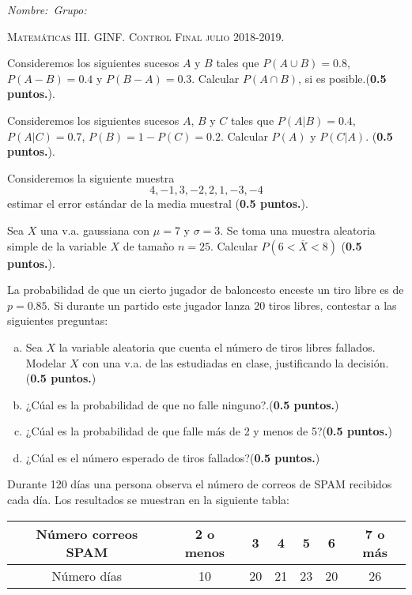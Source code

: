 \documentclass[12pt]{article}\usepackage[]{graphicx}\usepackage[]{color}
\newcounter{problemes}
\newcounter{punts} \def\thepunts{\arabic{punts}}
\def\probl{\addtocounter{problemes}{1} \setcounter{punts}{0}
\medskip\noindent{\bf \theproblemes) }}
\begin{document}
\noindent\emph{Nombre:}\hfill\hfill\hfill\hfill\hfill\hfill\hfill\ \emph{Grupo:}\hfill \vspace*{-2ex}

\begin{center}
\textsc{Matemáticas III. GINF. Control Final julio  2018-2019.}
\end{center}

\setcounter{problemes}{0}

\probl  Consideremos los siguientes sucesos $A$ y $B$ tales que 
$P(A\cup B)=0.8$, $P(A-B)=0.4$ y $P(B-A)=0.3$. Calcular $P(A\cap B)$, 
si es  posible.(\textbf{0.5 puntos.}).

\probl  Consideremos los siguientes sucesos $A$, $B$ y $C$ tales que
$P(A|B)=0.4$, $P(A|C)=0.7$, $P(B)=1-P(C)=0.2$. Calcular $P(A)$ y $P(C|A)$.
(\textbf{0.5 puntos.}).

\probl Consideremos la siguiente muestra $$4,-1,3,-2,2,1,-3,-4$$ estimar el error estándar de la media muestral (\textbf{0.5 puntos.}).

\probl  Sea $X$ una v.a. gaussiana con $\mu=7$ y $\sigma=3$. Se toma una muestra aleatoria simple de la variable $X$ de tamaño $n=25$. 
Calcular $P(6<\overline{X}<8)$  (\textbf{0.5 puntos.}).

\probl La probabilidad de que un cierto jugador de baloncesto enceste un tiro libre
es de $p=0.85$. Si durante un partido este jugador lanza 20 tiros libres,
contestar a las siguientes preguntas:
\begin{enumerate}[a)]
\item Sea $X$ la variable aleatoria que cuenta el número de tiros libres fallados.
Modelar $X$ con una v.a. de las estudiadas en clase, justificando la decisión.(\textbf{0.5 puntos.})
\item ¿Cúal es la probabilidad de que no falle ninguno?.(\textbf{0.5 puntos.})
\item ¿Cúal es la probabilidad de que falle más de 2 y menos de 5?(\textbf{0.5 puntos.})
\item ¿Cúal es el número esperado de tiros fallados?(\textbf{0.5 puntos.})
\end{enumerate}


\probl
Durante 120 días una persona observa el número de correos de SPAM recibidos
cada día. Los resultados se muestran en la siguiente tabla:


\begin{center}
\begin{tabular}{|c|cccccc|}
\hline
Número correos SPAM & 2 o menos & 3 & 4 & 5 & 6 & 7 o más\\ \hline
Número días & 10 & 20 & 21 & 23 & 20 & 26\\ \hline
\end{tabular}
\end{center}
\end{document}

